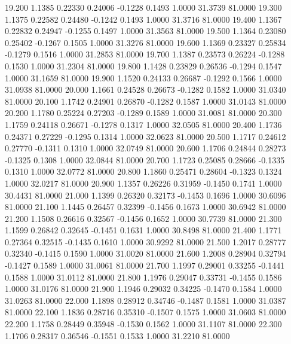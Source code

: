   19.200   1.1385   0.22330   0.24006  -0.1228   0.1493   1.0000  31.3739  81.0000
  19.300   1.1375   0.22582   0.24480  -0.1242   0.1493   1.0000  31.3716  81.0000
  19.400   1.1367   0.22832   0.24947  -0.1255   0.1497   1.0000  31.3563  81.0000
  19.500   1.1364   0.23080   0.25402  -0.1267   0.1505   1.0000  31.3276  81.0000
  19.600   1.1369   0.23327   0.25834  -0.1279   0.1516   1.0000  31.2853  81.0000
  19.700   1.1387   0.23573   0.26224  -0.1288   0.1530   1.0000  31.2304  81.0000
  19.800   1.1428   0.23829   0.26536  -0.1294   0.1547   1.0000  31.1659  81.0000
  19.900   1.1520   0.24133   0.26687  -0.1292   0.1566   1.0000  31.0938  81.0000
  20.000   1.1661   0.24528   0.26673  -0.1282   0.1582   1.0000  31.0340  81.0000
  20.100   1.1742   0.24901   0.26870  -0.1282   0.1587   1.0000  31.0143  81.0000
  20.200   1.1780   0.25224   0.27203  -0.1289   0.1589   1.0000  31.0081  81.0000
  20.300   1.1759   0.24118   0.26671  -0.1278   0.1317   1.0000  32.0505  81.0000
  20.400   1.1736   0.24371   0.27229  -0.1295   0.1314   1.0000  32.0623  81.0000
  20.500   1.1717   0.24612   0.27770  -0.1311   0.1310   1.0000  32.0749  81.0000
  20.600   1.1706   0.24844   0.28273  -0.1325   0.1308   1.0000  32.0844  81.0000
  20.700   1.1723   0.25085   0.28666  -0.1335   0.1310   1.0000  32.0772  81.0000
  20.800   1.1860   0.25471   0.28604  -0.1323   0.1324   1.0000  32.0217  81.0000
  20.900   1.1357   0.26226   0.31959  -0.1450   0.1741   1.0000  30.4431  81.0000
  21.000   1.1399   0.26320   0.32173  -0.1453   0.1696   1.0000  30.6096  81.0000
  21.100   1.1445   0.26457   0.32399  -0.1456   0.1673   1.0000  30.6942  81.0000
  21.200   1.1508   0.26616   0.32567  -0.1456   0.1652   1.0000  30.7739  81.0000
  21.300   1.1599   0.26842   0.32645  -0.1451   0.1631   1.0000  30.8498  81.0000
  21.400   1.1771   0.27364   0.32515  -0.1435   0.1610   1.0000  30.9292  81.0000
  21.500   1.2017   0.28777   0.32340  -0.1415   0.1590   1.0000  31.0020  81.0000
  21.600   1.2008   0.28904   0.32794  -0.1427   0.1589   1.0000  31.0061  81.0000
  21.700   1.1997   0.29001   0.33255  -0.1441   0.1588   1.0000  31.0112  81.0000
  21.800   1.1976   0.29047   0.33731  -0.1455   0.1586   1.0000  31.0176  81.0000
  21.900   1.1946   0.29032   0.34225  -0.1470   0.1584   1.0000  31.0263  81.0000
  22.000   1.1898   0.28912   0.34746  -0.1487   0.1581   1.0000  31.0387  81.0000
  22.100   1.1836   0.28716   0.35310  -0.1507   0.1575   1.0000  31.0603  81.0000
  22.200   1.1758   0.28449   0.35948  -0.1530   0.1562   1.0000  31.1107  81.0000
  22.300   1.1706   0.28317   0.36546  -0.1551   0.1533   1.0000  31.2210  81.0000
